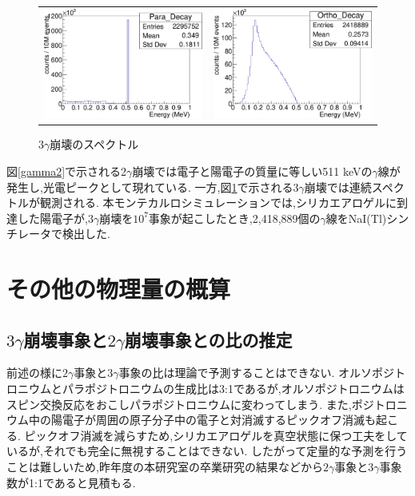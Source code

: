 \begin{figure}[!tbp]
	\begin{tabular}{cc}

	\centering
		\begin{minipage}{0.5\hsize}
		\includegraphics[width=7cm]{fig/gamma2.pdf}
	\caption{$2\gamma$崩壊のスペクトル}
	\label{gamma2}
		\end{minipage}&

		\begin{minipage}{0.5\hsize}
	\centering
		\includegraphics[width=7cm]{fig/gamma3.pdf}
	\caption{$3\gamma$崩壊のスペクトル}
	\label{gamma3}
		\end{minipage}

		\end{tabular}
\end{figure}

図\ref{gamma2}で示される2$\gamma$崩壊では電子と陽電子の質量に等しい511 keVの$\gamma$線が発生し,光電ピークとして現れている.
一方,図\ref{gamma3}で示される$3\gamma$崩壊では連続スペクトルが観測される.
本モンテカルロシミュレーションでは,シリカエアロゲルに到達した陽電子が,$3\gamma$崩壊を$10^7$事象が起こしたとき,2,418,889個の$\gamma$線をNaI(Tl)シンチレータで検出した.



\section{その他の物理量の概算}
\label{section_other}

\subsection{$3\gamma$崩壊事象と$2\gamma$崩壊事象との比の推定}
前述の様に$2\gamma$事象と$3\gamma$事象の比は理論で予測することはできない.
オルソポジトロニウムとパラポジトロニウムの生成比は3:1であるが,オルソポジトロニウムはスピン交換反応をおこしパラポジトロニウムに変わってしまう.
また,ポジトロニウム中の陽電子が周囲の原子分子中の電子と対消滅するピックオフ消滅も起こる.
ピックオフ消滅を減らすため,シリカエアロゲルを真空状態に保つ工夫をしているが,それでも完全に無視することはできない.
したがって定量的な予測を行うことは難しいため,昨年度の本研究室の卒業研究の結果\cite{卒業論文2015}などから$2\gamma$事象と$3\gamma$事象数が1:1であると見積もる.

